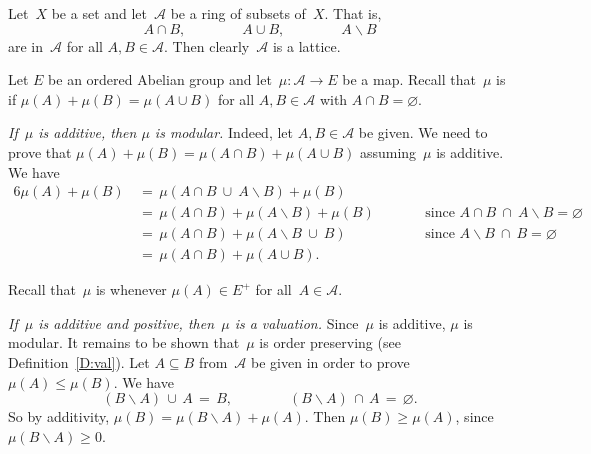 \documentclass[main.tex]{subfiles}
\begin{document}
%
%
\begin{ex}
\label{E:ring-val}
Let~$X$ be a set and let~$\mathcal{A}$ be a ring of subsets of~$X$.
That is,
\begin{equation*}
A\cap B,\qquad\qquad A\cup B,\qquad\qquad A\backslash B
\end{equation*}
are in~$\mathcal{A}$ for all $A,B\in\mathcal{A}$.
Then clearly~$\mathcal{A}$ is a lattice.

Let $E$ be an ordered Abelian group
and let~$\mu\colon \mathcal{A}\rightarrow E$ be a map.
Recall that~$\mu$ is  if $\mu(A) + \mu(B) = \mu(A\cup B)$
for all $A,B\in\mathcal{A}$ with $A\cap B=\varnothing$.

\emph{If~$\mu$ is additive,
then $\mu$ is modular.}
Indeed,
let $A,B\in \mathcal{A}$ be given. We need to prove that
$\mu(A) + \mu(B) =\mu(A\cap B) + \mu(A\cup B)$
assuming~$\mu$ is additive.
We have
\begin{alignat*}{6}
\mu(A) + \mu(B) \,
  & =\, \mu(A\cap B \ \cup\ A\backslash B) + \mu(B) \\ 
  & =\, \mu(A\cap B) + \mu(A\backslash B)  + \mu(B)\qquad
    && \text{since } A\cap B \ \cap\ A\backslash B = \varnothing \\ 
  & =\, \mu(A\cap B) + \mu(A\backslash B \ \cup\ B ) 
    && \text{since } A\backslash B\ \cap\ B = \varnothing \\
  & =\, \mu(A\cap B) + \mu(A\cup B).
\end{alignat*}

Recall that~$\mu$ is  whenever
$\mu(A)\in E^+$ for all~$A\in\mathcal{A}$.

\emph{If~$\mu$ is additive and positive,
then~$\mu$ is a valuation.}
Since~$\mu$ is additive,
$\mu$ is modular.
It remains to be shown that~$\mu$ is order preserving
(see Definition~\ref{D:val}).
Let $A\subseteq B$ from~$\mathcal{A}$ be given
in order to prove $\mu(A)\leq \mu(B)$.
We have
\begin{equation*}
(B\backslash A)\,\cup\, A\,=\,B,\qquad\qquad 
(B\backslash A)\,\cap\, A\,=\,\varnothing.
\end{equation*}
So by additivity, 
$\mu(B)=\mu(B\backslash A)+\mu(A)$.
Then $\mu(B)\geq \mu(A)$, since $\mu(B\backslash A)\geq 0$.
\end{ex}
\end{document}
